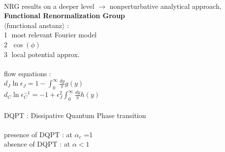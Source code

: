 \documentclass{article}
\begin{document}
\\
NRG results on a deeper level $\rightarrow$ nonperturbative analytical approach, \textbf{Functional Renormalization Group}\\
$\langle $functional anstanz$\rangle$ : \\
\textcircled{1} most relevant Fourier model \\
\textcircled{2} $\cos (\phi)$  \\
\textcircled{3} local potential approx. \\
\\
flow equations : \\
 $d_J \ln \epsilon_J = 1- \int^{\infty}_{0}\frac{dy}{\pi}g(y)$\\
 $d_C \ln \epsilon^{-1}_C = -1 + \epsilon^{2}_J\int^{\infty}_{0}\frac{dy}{\pi}h(y)$
 \\
 \\
DQPT : Dissipative Quantum Phase transition \\
\\
presence of DQPT : at $\alpha_c$ =1\\
absence of DQPT : at $\alpha < 1 $
\end{document}
